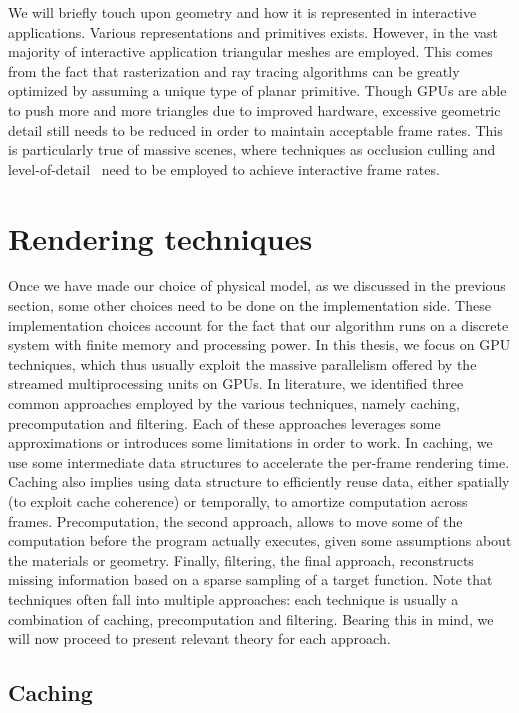 We will briefly touch upon geometry and how it is represented in interactive applications. Various representations and primitives exists. However, in the vast majority of interactive application triangular meshes are employed. This comes from the fact that rasterization and ray tracing algorithms can be greatly optimized by assuming a unique type of planar primitive. Though GPUs are able to push more and more triangles due to improved hardware, excessive geometric detail still needs to be reduced in order to maintain acceptable frame rates. This is particularly true of massive scenes, where techniques as occlusion culling and level-of-detail~\cite{Clark1976} need to be employed to achieve interactive frame rates. 

\section{Rendering techniques}
%
Once we have made our choice of physical model, as we discussed in the previous section,  some other choices need to be done on the implementation side. These implementation choices account for the fact that our algorithm runs on a discrete system with finite memory and processing power. In this thesis, we focus on GPU techniques, which thus usually exploit the massive parallelism offered by the streamed multiprocessing units on GPUs. In literature, we identified three common approaches employed by the various techniques, namely caching, precomputation and filtering. Each of these approaches leverages some approximations or introduces some limitations in order to work. In caching, we use some intermediate data structures to accelerate the per-frame rendering time. Caching also implies using data structure to efficiently reuse data, either spatially (to exploit cache coherence) or temporally, to amortize computation across frames. Precomputation, the second approach, allows to move some of the computation before the program actually executes, given some assumptions about the materials or geometry. Finally, filtering, the final approach, reconstructs missing information based on a sparse sampling of a target function. Note that techniques often fall into multiple approaches: each technique is usually a combination of caching, precomputation and filtering. Bearing this in mind, we will now proceed to present relevant theory for each approach. 

%
\subsection{Caching}

